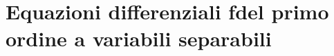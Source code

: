 \documentclass[../../dimostrazioni]{subfiles}
\begin{document}
    \chapter{Equazioni differenziali fdel primo ordine a variabili separabili}


            
\end{document}
